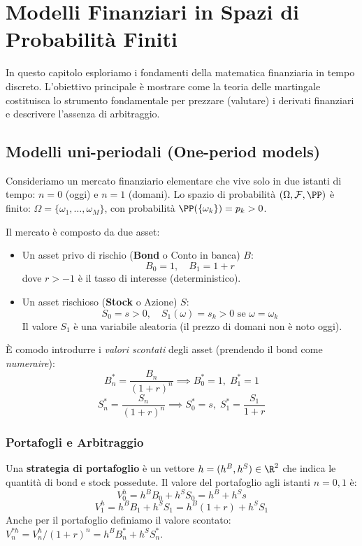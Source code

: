
\chapter{Modelli Finanziari in Spazi di Probabilità Finiti}

In questo capitolo esploriamo i fondamenti della matematica finanziaria in tempo discreto. L'obiettivo principale è mostrare come la teoria delle martingale costituisca lo strumento fondamentale per prezzare (valutare) i derivati finanziari e descrivere l'assenza di arbitraggio.

\section{Modelli uni-periodali (One-period models)}

Consideriamo un mercato finanziario elementare che vive solo in due istanti di tempo: $n=0$ (oggi) e $n=1$ (domani). Lo spazio di probabilità $(\Omega, \mathcal{F}, \PP)$ è finito: $\Omega = \{\omega_1, \dots, \omega_M\}$, con probabilità $\PP(\{\omega_k\}) = p_k > 0$.

Il mercato è composto da due asset:
\begin{itemize}
    \item Un asset privo di rischio (\textbf{Bond} o Conto in banca) $B$:
    \[ B_0 = 1, \quad B_1 = 1 + r \]
    dove $r > -1$ è il tasso di interesse (deterministico).
    \item Un asset rischioso (\textbf{Stock} o Azione) $S$:
    \[ S_0 = s > 0, \quad S_1(\omega) = s_k > 0 \text{ se } \omega = \omega_k \]
    Il valore $S_1$ è una variabile aleatoria (il prezzo di domani non è noto oggi).
\end{itemize}

È comodo introdurre i \emph{valori scontati} degli asset (prendendo il bond come \textit{numeraire}):
\[ B^*_n = \frac{B_n}{(1+r)^n} \implies B^*_0 = 1, \; B^*_1 = 1 \]
\[ S^*_n = \frac{S_n}{(1+r)^n} \implies S^*_0 = s, \; S^*_1 = \frac{S_1}{1+r} \]

\subsection{Portafogli e Arbitraggio}

Una \textbf{strategia di portafoglio} è un vettore $h = (h^B, h^S) \in \R^2$ che indica le quantità di bond e stock possedute. Il valore del portafoglio agli istanti $n=0, 1$ è:
\[ V_0^h = h^B B_0 + h^S S_0 = h^B + h^S s \]
\[ V_1^h = h^B B_1 + h^S S_1 = h^B (1+r) + h^S S_1 \]
Anche per il portafoglio definiamo il valore scontato: $V_n^{*h} = V_n^h / (1+r)^n = h^B B^*_n + h^S S^*_n$.

